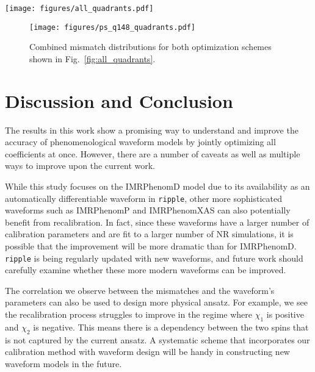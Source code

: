 \documentclass[twocolumn]{aastex631}
\newcommand{\ripple}{\texttt{ripple}}
\begin{document}
\begin{figure*}[t]
	\centering
	\texttt{[image: figures/all\_quadrants.pdf]}
	\caption{Distributions of mismatches for both split region optimization and all region optimization in all 4 
	regions. We use a constant PSD to calculate the mismatch and
	$\mathcal{L}_{\mathrm{ave}}$ as the loss function. The medians of each distribution are indicated by dashed
	lines.}
	\label{fig:all_quadrants}
\end{figure*}

\begin{figure}[t]
	\centering
	\texttt{[image: figures/ps\_q148\_quadrants.pdf]}
	\caption{Combined mismatch distributions for both optimization schemes shown in Fig.~\ref{fig:all_quadrants}.}
	\label{fig:ps_q148_quadrant}
\end{figure}

\section{Discussion and Conclusion} \label{sec:discussion}

The results in this work show a promising way to understand and improve the
accuracy of phenomenological waveform models by jointly optimizing all
coefficients at once. However, there are a number of caveats as well
as multiple ways to improve upon the current work.

While this study focuses on the IMRPhenomD model due to its availability as an
automatically differentiable waveform in \ripple, other more sophisticated waveforms such as
IMRPhenomP \citep{hannam2014simple, khan2019phenomenological} and IMRPhenomXAS
\citep{pratten2020setting,pratten2021computationally} can also potentially benefit
from recalibration. In fact, since these waveforms have a larger number of calibration
parameters and are fit to a larger number of NR simulations, it is possible that the 
improvement will be more dramatic than for IMRPhenomD. {\ripple} is being regularly
updated with new waveforms, and future work should carefully examine whether these more
modern waveforms can be improved. %

The correlation we observe between the mismatches and the waveform's parameters
can also be used to design more physical ansatz. For example, we see the
recalibration process struggles to improve in the regime where $\chi_{1}$ is
positive and $\chi_{2}$ is negative. This means there is a dependency between
the two spins that is not captured by the current ansatz. A systematic scheme that
incorporates our calibration method with waveform design will be handy in
constructing new waveform models in the future. 
\end{document}

